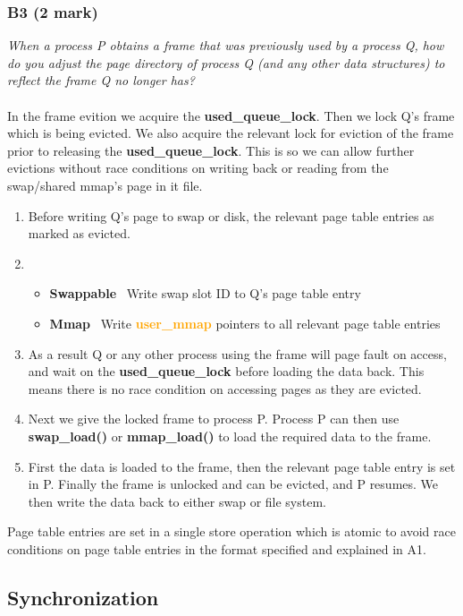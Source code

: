 \documentclass{report}
\newcommand{\question}[1]{\textit{#1} \ }
\newcommand{\bullpara}[2]{\item \textbf{#1} \ #2}
\newcommand{\fun}[1]{\textcolor{Emerald}{\textbf{#1}}}
\newcommand{\struct}[1]{\textcolor{orange}{\textbf{#1}}}
\newcommand{\var}[1]{\textcolor{RoyalPurple}{\textbf{#1}}}
\newcommand{\compitem}[1]{\begin{itemize}\setlength\itemsep{-0.1em}#1\end{itemize}}
\newcommand{\compenum}[1]{\begin{enumerate}\setlength\itemsep{-0.1em}#1\end{enumerate}}
\begin{document}
			\subsubsection*{B3 (2 mark)}
				\question{When a process P obtains a frame that was previously 
				used by a process Q, how do you adjust the page directory of
				process Q (and any other data structures) to reflect the frame 
				Q no longer has?}
				\\
				\\ In the frame evition we acquire the \var{used\_queue\_lock}.
				Then we lock Q's frame which is being evicted.
				We also acquire the relevant lock for eviction of the frame 
				prior to releasing the \var{used\_queue\_lock}. This is so we 
				can allow further evictions without race conditions on writing 
				back or reading from the swap/shared mmap's page in it file.
				
				\compenum {
					\item Before writing Q's page to swap or disk, 
					the relevant page table entries as marked as evicted.
					\item \compitem{
						\bullpara{Swappable}
						{Write swap slot ID to Q's page table entry}
						\bullpara{Mmap}
						{Write \struct{user\_mmap} pointers to all relevant page
						table entries}}
					\item As a result Q or any other process using the frame 
						will page fault on access, and wait on the 
						\var{used\_queue\_lock} before loading the data back.
						This means there is no race condition on accessing
						pages as they are evicted.
					\item Next we give the locked frame to process P. Process P 
						can then use \fun{swap\_load()} or \fun{mmap\_load()} to 
						load the required data to the frame. 
					\item First the data is loaded to the frame, then the 
						relevant page table entry is set in P. Finally the frame
						is unlocked and can be evicted, and P resumes. We then
						write the data back to either swap or file system.
				}
				Page table entries are set in a single store operation which is 
				atomic to avoid race conditions on page table entries in the 
				format specified and explained in A1.

		\subsection*{Synchronization}
\end{document}
